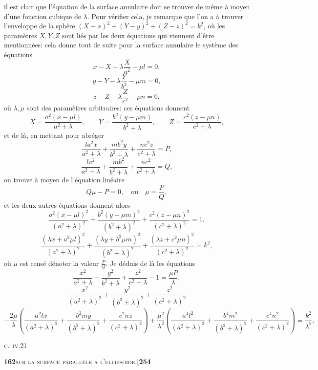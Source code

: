 \documentclass[11pt]{article}
\begin{document}
\medskip

\noindent il est clair que l'équation de la surface annulaire doit se trouver de même à moyen d'une fonction cubique de $\lambda$. Pour vérifier cela, je remarque que l'on a à trouver l'enveloppe de la sphère $(X - x)^2 + (Y - y)^2 + (Z - z)^2 = k^2$, où les paramètres $X, Y, Z$ sont liés par les deux équations qui viennent d'être mentionnées: cela donne tout de suite pour la surface annulaire le système des équations
\[
x - X - \lambda \frac{X}{a^2} - \mu l = 0,
\]
\[
y - Y - \lambda \frac{Y}{b^2} - \mu m = 0,
\]
\[
z - Z - \lambda \frac{Z}{c^2} - \mu n = 0,
\]
où $\lambda, \mu$ sont des paramètres arbitraires: ces équations donnent
\[
X = \frac{a^2(x - \mu l)}{a^2 + \lambda},\qquad Y = \frac{b^2(y - \mu m)}{b^2 + \lambda},\qquad Z = \frac{c^2(z - \mu n)}{c^2 + \lambda},
\]
et de là, en mettant pour abréger
\[
\frac{la^2x}{a^2 + \lambda} + \frac{mb^2y}{b^2 + \lambda} + \frac{nc^2z}{c^2 + \lambda} = P,
\]
\[
\frac{la^2}{a^2 + \lambda} + \frac{mb^2}{b^2 + \lambda} + \frac{nc^2}{c^2 + \lambda} = Q,
\]
on trouve à moyen de l'équation linéaire
\[
Q\mu - P = 0,\quad \text{ou}\quad \mu = \frac{P}{Q},
\]
et les deux autres équations donnent alors
\[
\frac{a^2(x - \mu l)^2}{(a^2 + \lambda)^2} + \frac{b^2(y - \mu m)^2}{(b^2 + \lambda)^2} + \frac{c^2(z - \mu n)^2}{(c^2 + \lambda)^2} = 1,
\]
\[
\frac{(\lambda x + a^2\mu l)^2}{(a^2 + \lambda)^2} + \frac{(\lambda y + b^2\mu m)^2}{(b^2 + \lambda)^2} + \frac{(\lambda z + c^2\mu n)^2}{(c^2 + \lambda)^2} = k^2,
\]
où $\mu$ est censé dénoter la valeur $\tfrac{P}{Q}$. Je déduis de là les équations
\[
\frac{x^2}{a^2 + \lambda} + \frac{y^2}{b^2 + \lambda} + \frac{z^2}{c^2 + \lambda} - 1 = \frac{\mu P}{\lambda},
\]
\[
\frac{x^2}{(a^2 + \lambda)^2} + \frac{y^2}{(b^2 + \lambda)^2} + \frac{z^2}{(c^2 + \lambda)^2}
\]
\[
- \frac{2\mu}{\lambda}\left(\frac{a^2lx}{(a^2 + \lambda)^2} + \frac{b^2my}{(b^2 + \lambda)^2} + \frac{c^2nz}{(c^2 + \lambda)^2}\right) + \frac{\mu^2}{\lambda^2}\left(\frac{a^4l^2}{(a^2 + \lambda)^2} + \frac{b^4m^2}{(b^2 + \lambda)^2} + \frac{c^4n^2}{(c^2 + \lambda)^2}\right) = \frac{k^2}{\lambda^2}.
\]

\hfill\textsc{c.~iv.}\hfill 21

\newpage

\noindent\textbf{162}\hfill\textsc{sur la surface parallèle à l'ellipsoïde.}\hfill\textbf{[254}

\medskip
\end{document}
